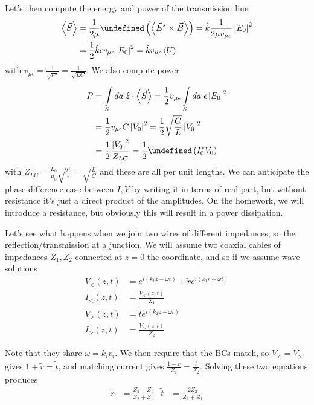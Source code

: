 \documentclass[10pt]{report}
\let\Re\undefined
\DeclareMathOperator{\Re}{Re}
\newcommand{\expvalue}[1]{\left<#1\right>}
\newcommand{\abs}[1]{\left|#1\right|}
\begin{document}
Let's then compute the energy and power of the transmission line
\begin{align}
    \expvalue{\vec{S}} &= \frac{1}{2\mu}\Re\left( \expvalue{\vec{E}^* \times \vec{B}} \right) = \hat{k}\frac{1}{2\mu v_{\mu \epsilon}} \abs{E_0}^2\\
    &= \frac{1}{2}\hat{k}\epsilon v_{\mu\epsilon}\abs{E_0}^2 = \hat{k}v_{\mu \epsilon} \expvalue{U}
\end{align}
with $v_{\mu\epsilon} = \frac{1}{\sqrt{\mu \epsilon}} = \frac{1}{\sqrt{LC}}$. We also compute power
\begin{align}
    P &= \int\limits_{S}^{}da\;\hat{z} \cdot \expvalue{\vec{S}} = \frac{1}{2}v_{\mu\epsilon} \int\limits_{S}^{}da\;\epsilon \abs{E_0}^2\\
    &= \frac{1}{2}v_{\mu \epsilon}C\abs{V_0}^2 = \frac{1}{2}\sqrt{\frac{C}{L}}\abs{V_0}^2\\
    &= \frac{1}{2}\frac{\abs{V_0}^2}{Z_{LC}} = \frac{1}{2}\Re\left( I_0^* V_0 \right)
\end{align}
with $Z_{LC} = \frac{L_0}{\mu_0}\sqrt{\frac{\mu}{\epsilon}} = \sqrt{\frac{L}{C}}$ and these are all per unit lengths. We can anticipate the phase difference case between $I,V$ by writing it in terms of real part, but without resistance it's just a direct product of the amplitudes. On the homework, we will introduce a resistance, but obviously this will result in a power dissipation.

Let's see what happens when we join two wires of different impedances, so the reflection/transmission at a junction. We will assume two coaxial cables of impedances $Z_1, Z_2$ connected at $z=0$ the coordinate, and so if we assume wave solutions
\begin{align}
    V_<(z,t) &= e^{i(k_1z - \omega t)} + \tilde{r}e^{i(k_1r + \omega t)}\\
    I_<(z,t) &= \frac{V_<(z,t)}{Z_1}\\
    V_>(z,t) &= \tilde{t}e^{i(k_2z - \omega t)}\\
    I_>(z,t) &= \frac{V_>(z,t)}{Z_2}
\end{align}

Note that they share $\omega = k_iv_i$. We then require that the BCs match, so $V_{<} = V_{>}$ gives $1 + \tilde{r} = \tilde{t}$, and matching current gives $\frac{1 - \tilde{r}}{Z_1} = \frac{\tilde{t}}{Z_2}$. Solving these two equations produces
\begin{align}
    \tilde{r} &= \frac{Z_2 - Z_1}{ Z_2 + Z_1} & \tilde{t} &= \frac{2Z_2}{Z_2 + Z_1}
\end{align}
\end{document}
